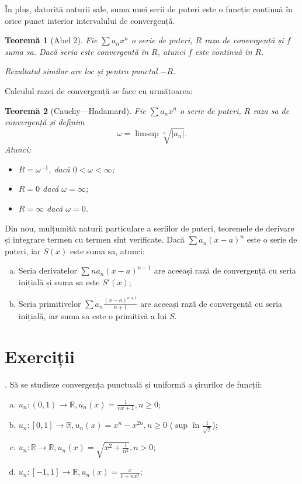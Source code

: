 \documentclass[11pt,a4paper]{article}
\newcommand\RR{\mathbb{R}}
\theoremstyle{dotless}
\newtheorem{theorem}{Teorem\u{a}}[section]
\theoremstyle{dotlessdr}
\begin{document}
În plus, datorită naturii sale, suma unei serii de puteri este o funcție continuă în
orice punct interior intervalului de convergență.

\begin{theorem}[Abel 2]\label{thm:abel-2}
  Fie $\sum a_n x^n$ o serie de puteri, $R$ raza de convergență și $f$ suma sa.
  Dacă seria este convergentă în $R$, atunci $f$ este continuă în $R$.

  Rezultatul similar are loc și pentru punctul $-R$.
\end{theorem}

Calculul razei de convergență se face cu următoarea:

\begin{theorem}[Cauchy---Hadamard]\label{thm:cauchy-had}
  Fie $\sum a_n x^n$ o serie de puteri, $R$ raza sa de convergență și definim
  \[
    \omega = \limsup \sqrt[n]{|a_n|}.
  \]
  Atunci:
  \begin{itemize}
  \item $R = \omega^{-1}$, dacă $0 < \omega < \infty$;
  \item $R = 0$ dacă $\omega = \infty$;
  \item $R = \infty$ dacă $\omega = 0$.
  \end{itemize}
\end{theorem}

Din nou, mulțumită naturii particulare a seriilor de puteri, teoremele de derivare și
integrare termen cu termen sînt verificate. Dacă $\sum a_n (x - a)^n$ este o serie de
puteri, iar $S(x)$ este suma sa, atunci:
\begin{enumerate}[(a)]
\item Seria derivatelor $\sum na_n (x - a)^{n - 1}$ are aceeași rază de convergență
  cu seria inițială și suma sa este $S'(x)$;
\item Seria primitivelor $\sum a_n \frac{(x - a)^{n + 1}}{n + 1}$ are aceeași rază
  de convergență cu seria inițială, iar suma sa este o primitivă a lui $S$.
\end{enumerate}


\section{Exerciții}
\label{sec:ex}

\indent{}. Să se studieze convergența punctuală și uniformă a șirurilor de funcții:
\begin{enumerate}[(a)]
\item $u_n : (0, 1) \to \RR, u_n(x) = \frac{1}{nx + 1}, n \geq 0$;
\item $u_n : [0, 1] \to \RR, u_n(x) = x^n - x^{2n}, n \geq 0$ ($\sup$ în $\frac{1}{\sqrt{2}}$);
\item $u_n : \RR \to \RR, u_n(x) = \sqrt{x^2 + \frac{1}{n^2}}, n > 0$;
\item $u_n : [-1, 1] \to \RR, u_n(x) = \frac{x}{1 + nx^2}$;
\end{enumerate}
\end{document}
